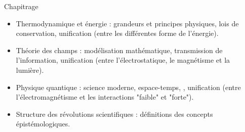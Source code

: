 \vspace{3cm}


Chapitrage

\begin{itemize}[leftmargin=1cm, itemsep=1pt]%
\item Thermodynamique et énergie : grandeurs et principes physiques, lois de conservation, unification (entre les différentes forme de l'énergie).
\item Théorie des champs : modélisation mathématique, transmission de l'information, unification (entre l'électrostatique, le magnétisme et la lumière).
\item Physique quantique : science moderne, espace-temps, , unification (entre l'électromagnétisme et les interactions "faible" et "forte").
\item Structure des révolutions scientifiques : définitions des concepts épistémologiques.
\end{itemize}


